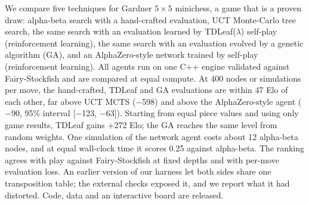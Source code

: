 We compare five techniques for Gardner $5\times5$ minichess, a game that is a proven draw: alpha-beta search with a hand-crafted evaluation, UCT Monte-Carlo tree search, the same search with an evaluation learned by TDLeaf($\lambda$) self-play (reinforcement learning), the same search with an evaluation evolved by a genetic algorithm (GA), and an AlphaZero-style network trained by self-play (reinforcement learning). All agents run on one C++ engine validated against Fairy-Stockfish and are compared at equal compute. At 400 nodes or simulations per move, the hand-crafted, TDLeaf and GA evaluations are within 47 Elo of each other, far above UCT MCTS ($-$598) and above the AlphaZero-style agent ($-$90, 95\% interval [$-$123, $-$63]). Starting from equal piece values and using only game results, TDLeaf gains +272 Elo; the GA reaches the same level from random weights. One simulation of the network agent costs about 12 alpha-beta nodes, and at equal wall-clock time it scores 0.25 against alpha-beta. The ranking agrees with play against Fairy-Stockfish at fixed depths and with per-move evaluation loss. An earlier version of our harness let both sides share one transposition table; the external checks exposed it, and we report what it had distorted. Code, data and an interactive board are released.
